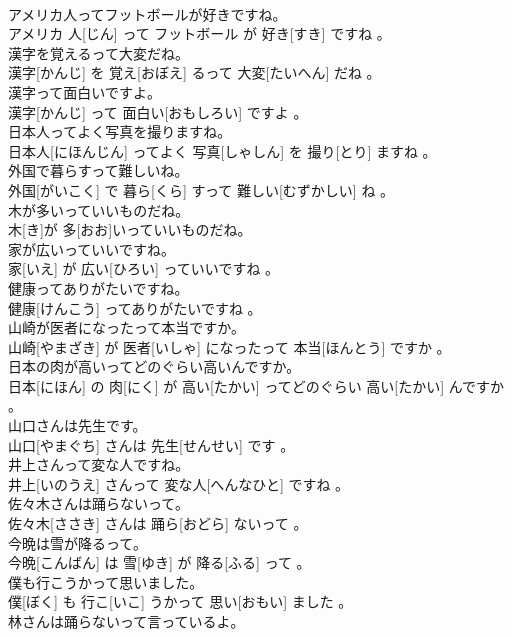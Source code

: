 \documentclass[8pt]{extreport}
\begin{document}
\begin{CJK}{UTF8}{min}
\\	アメリカ人ってフットボールが好きですね。	
\\	アメリカ 人[じん] って フットボール が 好き[すき] ですね 。
\\	漢字を覚えるって大変だね。	
\\	漢字[かんじ] を 覚え[おぼえ] るって 大変[たいへん] だね 。
\\	漢字って面白いですよ。	
\\	漢字[かんじ] って 面白い[おもしろい] ですよ 。
\\	日本人ってよく写真を撮りますね。	
\\	日本人[にほんじん] ってよく 写真[しゃしん] を 撮り[とり] ますね 。
\\	外国で暮らすって難しいね。	
\\	外国[がいこく] で 暮ら[くら] すって 難しい[むずかしい] ね 。
\\	木が多いっていいものだね。	
\\	木[き]が 多[おお]いっていいものだね。
\\	家が広いっていいですね。	
\\	家[いえ] が 広い[ひろい] っていいですね 。
\\	健康ってありがたいですね。	
\\	健康[けんこう] ってありがたいですね 。
\\	山崎が医者になったって本当ですか。	
\\	山崎[やまざき] が 医者[いしゃ] になったって 本当[ほんとう] ですか 。
\\	日本の肉が高いってどのぐらい高いんですか。	
\\	日本[にほん] の 肉[にく] が 高い[たかい] ってどのぐらい 高い[たかい] んですか 。
\\	山口さんは先生です。	
\\	山口[やまぐち] さんは 先生[せんせい] です 。
\\	井上さんって変な人ですね。	
\\	井上[いのうえ] さんって 変な人[へんなひと] ですね 。
\\	佐々木さんは踊らないって。	
\\	佐々木[ささき] さんは 踊ら[おどら] ないって 。
\\	今晩は雪が降るって。	
\\	今晩[こんばん] は 雪[ゆき] が 降る[ふる] って 。
\\	僕も行こうかって思いました。	
\\	僕[ぼく] も 行こ[いこ] うかって 思い[おもい] ました 。
\\	林さんは踊らないって言っているよ。	

\end{CJK}
\end{document}

